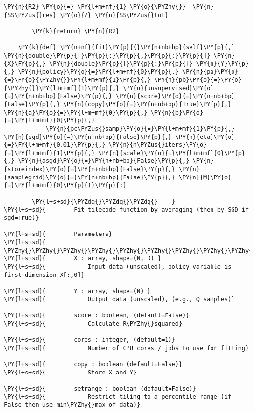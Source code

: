 \begin{Verbatim}[commandchars=\\\{\}]
        \PY{n}{R2} \PY{o}{=} \PY{l+m+mf}{1} \PY{o}{\PYZhy{}}  \PY{n}{SS\PYZus{}res} \PY{o}{/} \PY{n}{SS\PYZus{}tot}

        \PY{k}{return} \PY{n}{R2}
        
    \PY{k}{def} \PY{n+nf}{fit}\PY{p}{(}\PY{n+nb+bp}{self}\PY{p}{,} \PY{n}{double}\PY{p}{[}\PY{p}{:}\PY{p}{,}\PY{p}{:}\PY{p}{]} \PY{n}{X}\PY{p}{,} \PY{n}{double}\PY{p}{[}\PY{p}{:}\PY{p}{]} \PY{n}{Y}\PY{p}{,} \PY{n}{policy}\PY{o}{=}\PY{l+m+mf}{0}\PY{p}{,} \PY{n}{pa}\PY{o}{=}\PY{o}{\PYZhy{}}\PY{l+m+mf}{1}\PY{p}{,} \PY{n}{pb}\PY{o}{=}\PY{o}{\PYZhy{}}\PY{l+m+mf}{1}\PY{p}{,} \PY{n}{unsupervised}\PY{o}{=}\PY{n+nb+bp}{False}\PY{p}{,} \PY{n}{score}\PY{o}{=}\PY{n+nb+bp}{False}\PY{p}{,} \PY{n}{copy}\PY{o}{=}\PY{n+nb+bp}{True}\PY{p}{,} \PY{n}{a}\PY{o}{=}\PY{l+m+mf}{0}\PY{p}{,} \PY{n}{b}\PY{o}{=}\PY{l+m+mf}{0}\PY{p}{,} 
            \PY{n}{pc\PYZus{}samp}\PY{o}{=}\PY{l+m+mf}{1}\PY{p}{,} \PY{n}{sgd}\PY{o}{=}\PY{n+nb+bp}{False}\PY{p}{,} \PY{n}{eta}\PY{o}{=}\PY{l+m+mf}{0.01}\PY{p}{,} \PY{n}{n\PYZus{}iters}\PY{o}{=}\PY{l+m+mf}{1}\PY{p}{,} \PY{n}{scale}\PY{o}{=}\PY{l+m+mf}{0}\PY{p}{,} \PY{n}{asgd}\PY{o}{=}\PY{n+nb+bp}{False}\PY{p}{,} \PY{n}{storeindex}\PY{o}{=}\PY{n+nb+bp}{False}\PY{p}{,} \PY{n}{samplegrid}\PY{o}{=}\PY{n+nb+bp}{False}\PY{p}{,} \PY{n}{M}\PY{o}{=}\PY{l+m+mf}{0}\PY{p}{)}\PY{p}{:}

        \PY{l+s+sd}{\PYZdq{}\PYZdq{}\PYZdq{}    }
\PY{l+s+sd}{        Fit tilecode function by averaging (then by SGD if sgd=True)}

\PY{l+s+sd}{        Parameters}
\PY{l+s+sd}{        \PYZhy{}\PYZhy{}\PYZhy{}\PYZhy{}\PYZhy{}\PYZhy{}\PYZhy{}\PYZhy{}\PYZhy{}\PYZhy{}\PYZhy{}}
\PY{l+s+sd}{        X : array, shape=(N, D) }
\PY{l+s+sd}{            Input data (unscaled), policy variable is first dimension X[:,0]}

\PY{l+s+sd}{        Y : array, shape=(N) }
\PY{l+s+sd}{            Output data (unscaled), (e.g., Q samples)}

\PY{l+s+sd}{        score : boolean, (default=False)}
\PY{l+s+sd}{            Calculate R\PYZhy{}squared}

\PY{l+s+sd}{        cores : integer, (default=1)}
\PY{l+s+sd}{            Number of CPU cores / jobs to use for fitting}

\PY{l+s+sd}{        copy : boolean (default=False)}
\PY{l+s+sd}{            Store X and Y}

\PY{l+s+sd}{        setrange : boolean (default=False)}
\PY{l+s+sd}{            Restrict tiling to a percentile range (if False then use min\PYZhy{}max of data)}


\end{Verbatim}
